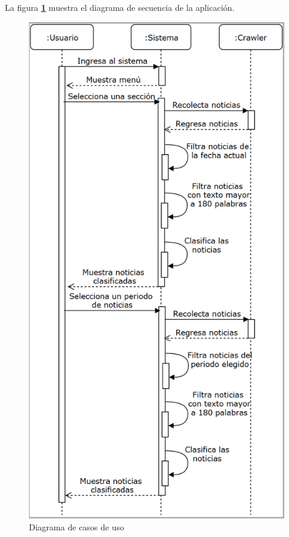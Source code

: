


La figura \textbf{\ref{fig:DSE}} muestra el diagrama de secuencia de la aplicación. 

\begin{figure}[H]
  \centering
  \includegraphics[scale=.6]{imagenes/Diagramas/Secuencia/Diagrama}
  \caption{Diagrama de casos de uso}
  \label{fig:DSE}
\end{figure}

